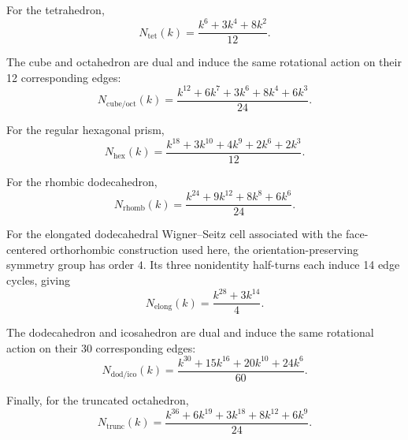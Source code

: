 \documentclass[acmtog]{acmart}
\begin{document}
For the tetrahedron,
\begin{equation}
N_{\mathrm{tet}}(k)=\frac{k^6+3k^4+8k^2}{12}.
\end{equation}

The cube and octahedron are dual and induce the same rotational action on their 12 corresponding edges:
\begin{equation}
N_{\mathrm{cube/oct}}(k)=\frac{k^{12}+6k^7+3k^6+8k^4+6k^3}{24}.
\end{equation}

For the regular hexagonal prism,
\begin{equation}
N_{\mathrm{hex}}(k)=\frac{k^{18}+3k^{10}+4k^9+2k^6+2k^3}{12}.
\end{equation}

For the rhombic dodecahedron,
\begin{equation}
N_{\mathrm{rhomb}}(k)=\frac{k^{24}+9k^{12}+8k^8+6k^6}{24}.
\end{equation}

For the elongated dodecahedral Wigner--Seitz cell associated with the face-centered orthorhombic construction used here, the orientation-preserving symmetry group has order $4$. Its three nonidentity half-turns each induce 14 edge cycles, giving
\begin{equation}
N_{\mathrm{elong}}(k)=\frac{k^{28}+3k^{14}}{4}.
\end{equation}

The dodecahedron and icosahedron are dual and induce the same rotational action on their 30 corresponding edges:
\begin{equation}
N_{\mathrm{dod/ico}}(k)=\frac{k^{30}+15k^{16}+20k^{10}+24k^6}{60}.
\end{equation}

Finally, for the truncated octahedron,
\begin{equation}
N_{\mathrm{trunc}}(k)=\frac{k^{36}+6k^{19}+3k^{18}+8k^{12}+6k^9}{24}.
\end{equation}
\end{document}
